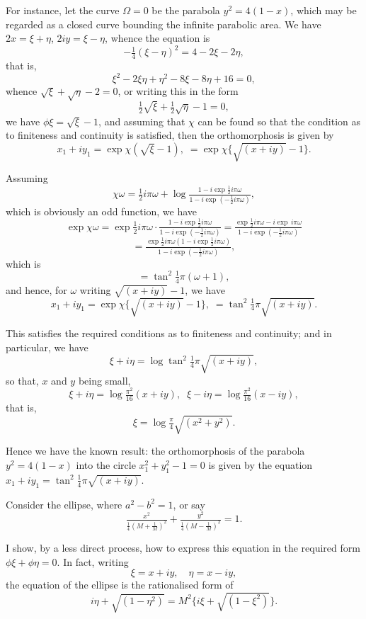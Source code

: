\documentclass[11pt]{article}
\begin{document}
For instance, let the curve $\Omega = 0$ be the parabola $y^{2} = 4(1 - x)$, which may be regarded as a closed curve bounding the infinite parabolic area. We have $2x = \xi + \eta$, $2iy = \xi - \eta$, whence the equation is
\[ -\tfrac{1}{4}(\xi - \eta)^{2} = 4 - 2\xi - 2\eta, \]
that is,
\[ \xi^{2} - 2\xi\eta + \eta^{2} - 8\xi - 8\eta + 16 = 0, \]
whence $\sqrt{\xi} + \sqrt{\eta} - 2 = 0$, or writing this in the form
\[ \tfrac{1}{2}\sqrt{\xi} + \tfrac{1}{2}\sqrt{\eta} - 1 = 0, \]
we have $\phi\xi = \sqrt{\xi} - 1$, and assuming that $\chi$ can be found so that the condition as to finiteness and continuity is satisfied, then the orthomorphosis is given by
\[ x_{1} + iy_{1} = \exp\chi(\sqrt{\xi} - 1),\;=\exp\chi\{\sqrt{(x + iy)} - 1\}. \]

Assuming
\[ \chi\omega = \tfrac{1}{2}i\pi\omega + \log\tfrac{1 - i\exp\tfrac{1}{2}i\pi\omega}{1 - i\exp\!\left(-\tfrac{1}{2}i\pi\omega\right)}, \]
which is obviously an odd function, we have
\[ \exp\chi\omega = \exp\tfrac{1}{2}i\pi\omega\cdot\tfrac{1 - i\exp\tfrac{1}{2}i\pi\omega}{1 - i\exp\!\left(-\tfrac{1}{2}i\pi\omega\right)} = \tfrac{\exp\tfrac{1}{2}i\pi\omega - i\exp\,i\pi\omega}{1 - i\exp\!\left(-\tfrac{1}{2}i\pi\omega\right)} \]
\[ = \tfrac{\exp\tfrac{1}{2}i\pi\omega(1 - i\exp\tfrac{1}{2}i\pi\omega)}{1 - i\exp\!\left(-\tfrac{1}{2}i\pi\omega\right)}, \]
which is
\[ = \tan^{2}\tfrac{1}{4}\pi(\omega + 1), \]
and hence, for $\omega$ writing $\sqrt{(x + iy)} - 1$, we have
\[ x_{1} + iy_{1} = \exp\chi\{\sqrt{(x + iy)} - 1\},\;= \tan^{2}\tfrac{1}{4}\pi\sqrt{(x + iy)}. \]

This satisfies the required conditions as to finiteness and continuity; and in particular, we have
\[ \xi + i\eta = \log\tan^{2}\tfrac{1}{4}\pi\sqrt{(x + iy)}, \]
so that, $x$ and $y$ being small,
\[ \xi + i\eta = \log\tfrac{\pi^{2}}{16}(x + iy),\;\;\xi - i\eta = \log\tfrac{\pi^{2}}{16}(x - iy), \]
that is,
\[ \xi = \log\tfrac{\pi}{4}\sqrt{(x^{2} + y^{2})}. \]

Hence we have the known result: the orthomorphosis of the parabola $y^{2} = 4(1 - x)$ into the circle $x_{1}^{2} + y_{1}^{2} - 1 = 0$ is given by the equation $x_{1} + iy_{1} = \tan^{2}\tfrac{1}{4}\pi\sqrt{(x + iy)}$.

Consider the ellipse, where $a^{2} - b^{2} = 1$, or say
\[ \tfrac{x^{2}}{\tfrac{1}{4}(M + \tfrac{1}{M})^{2}} + \tfrac{y^{2}}{\tfrac{1}{4}(M - \tfrac{1}{M})^{2}} = 1. \]

I show, by a less direct process, how to express this equation in the required form $\phi\xi + \phi\eta = 0$. In fact, writing
\[ \xi = x + iy,\quad \eta = x - iy, \]
the equation of the ellipse is the rationalised form of
\[ i\eta + \sqrt{(1 - \eta^{2})} = M^{2}\{i\xi + \sqrt{(1 - \xi^{2})}\}. \]
\end{document}
